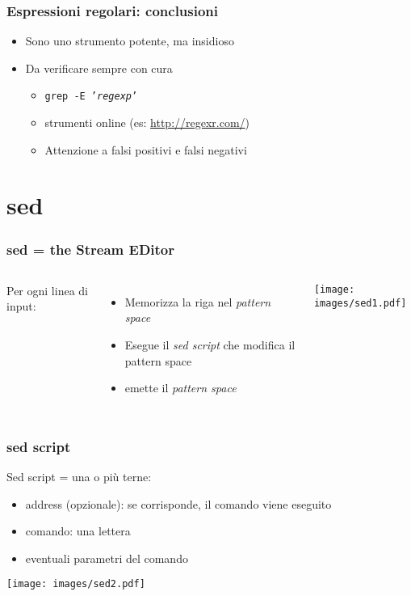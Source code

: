 \documentclass[xetex,table]{beamer}
\begin{document}
\begin{frame}
  \frametitle{Espressioni regolari: conclusioni}
  \begin{itemize}
  \item Sono uno strumento potente, ma insidioso
  \item Da verificare sempre con cura
    \begin{itemize}
    \item \texttt{grep -E '{\em regexp}'}
    \item strumenti online (es: \url{http://regexr.com/})
    \item Attenzione a falsi positivi e falsi negativi
    \end{itemize}
  \end{itemize}
\end{frame}

\section{sed}

\begin{frame}
  \frametitle{sed = the Stream EDitor}
  \begin{columns}
    Per ogni linea di input:
    \begin{itemize}
    \item Memorizza la riga nel {\em pattern space}
    \item Esegue il {\em sed script} che modifica il pattern space
    \item emette il {\em pattern space}
    \end{itemize}
    \begin{center}
      \texttt{[image: images/sed1.pdf]}
    \end{center}
  \end{columns}
\end{frame}

\begin{frame}
  \frametitle{sed script}
  Sed script = una o più terne:
  \begin{itemize}
  \item address (opzionale): se corrisponde, il comando viene eseguito
  \item comando: una lettera
  \item eventuali parametri del comando
  \end{itemize}
  \begin{center}
    \texttt{[image: images/sed2.pdf]}
  \end{center}
\end{frame}
\end{document}
